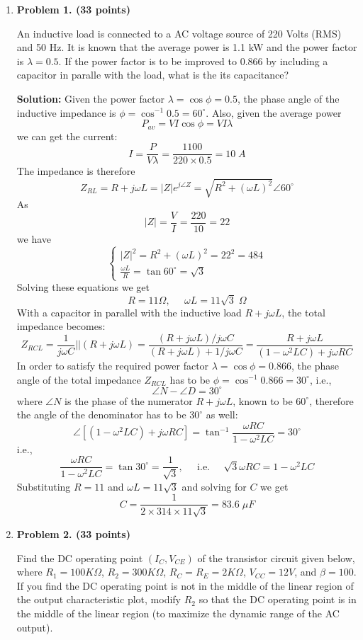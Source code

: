 \begin{enumerate}

\item {\bf Problem 1. (33 points)} 


An inductive load is connected to a AC voltage source of 220 Volts (RMS)
and 50 Hz. It is known that the average power is 1.1 kW and the power
factor is $\lambda=0.5$. If the power factor is to be improved to 0.866 
by including a capacitor in paralle with the load, what is the its
capacitance?


{\bf Solution:}
Given the power factor $\lambda=\cos\phi=0.5$, the phase angle of the inductive
impedance is $\phi=\cos^{-1}0.5=60^\circ$. Also, given the average power
\[ P_{av}=VI\cos\phi =VI \lambda \]
we can get the current:
\[ I=\frac{P}{V\lambda}=\frac{1100}{220\times 0.5}=10\;A \]
The impedance is therefore
\[ Z_{RL}=R+j\omega L=|Z| e^{j\angle Z}=\sqrt{R^2+(\omega L)^2}\angle 60^\circ \]
As
\[ |Z|=\frac{V}{I}=\frac{220}{10}=22 \]
we have
\[ \left\{ \begin{array}{l}
  |Z|^2=R^2+(\omega L)^2=22^2=484 \\
  \frac{\omega L}{R}=\tan 60^\circ=\sqrt{3} \end{array} \right. \]
Solving these equations we get
\[ R=11\Omega,\;\;\;\;\;\omega L=11\sqrt{3}\;\Omega \]
With a capacitor in parallel with the inductive load $R+j\omega L$, the total
impedance becomes:
\[ Z_{RCL}=\frac{1}{j\omega C} || (R+j\omega L)
=\frac{(R+j\omega L)/j\omega C}{(R+j\omega L)+1/j\omega C}
=\frac{R+j\omega L}{(1-\omega^2LC)+j\omega RC} \]
In order to satisfy the required power factor $\lambda=\cos \phi=0.866$, 
the phase angle of the total impedance $Z_{RCL}$ has to be 
$\phi=\cos^{-1} 0.866=30^\circ$, i.e., 
\[ \angle N-\angle D=30^\circ \]
where $\angle N$ is the phase of the numerator $R+j\omega L$, known to be
$60^\circ$, therefore the angle of the denominator has to be $30^\circ$ as
well:
\[ \angle [(1-\omega^2LC)+j\omega RC]
=\tan^{-1}\frac{\omega RC}{1-\omega^2 LC}=30^\circ \]
i.e.,
\[ 
\frac{\omega RC}{1-\omega^2 LC}=\tan 30^\circ =\frac{1}{\sqrt{3}},
\;\;\;\;\;\mbox{i.e.}\;\;\;\;\;
\sqrt{3}\omega RC=1-\omega^2 LC
\]
Substituting $R=11$ and $\omega L=11\sqrt{3} $ and solving for $C$
we get
\[ C=\frac{1}{2\times314\times 11\sqrt{3}}=83.6\;\mu F \]

\item {\bf Problem 2. (33 points)} 

Find the DC operating point $(I_C, V_{CE})$ of the transistor circuit 
given below, where $R_1=100K\Omega$, $R_2=300K\Omega$, $R_C=R_E=2K\Omega$, 
$V_{CC}=12V$, and $\beta=100$. If you find the DC operating point is not 
in the middle of the linear region of the output characteristic plot, 
modify $R_2$ so that the DC operating point is in the middle of the linear
region (to maximize the dynamic range of the AC output).


\end{enumerate}
